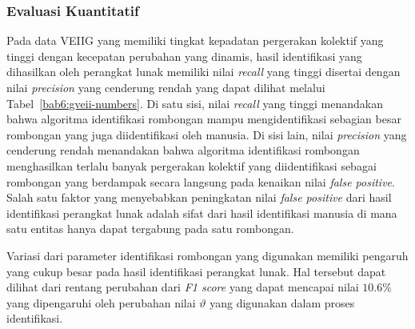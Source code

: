 \subsubsection{Evaluasi Kuantitatif}
\label{subsubsec:veiig-quantitative}

Pada data VEIIG yang memiliki tingkat kepadatan pergerakan kolektif yang tinggi dengan kecepatan perubahan yang dinamis, hasil identifikasi yang dihasilkan oleh perangkat lunak memiliki nilai \textit{recall} yang tinggi disertai dengan nilai \textit{precision} yang cenderung rendah yang dapat dilihat melalui Tabel~\ref{bab6:gveii-numbers}. Di satu sisi, nilai \textit{recall} yang tinggi menandakan bahwa algoritma identifikasi rombongan mampu mengidentifikasi sebagian besar rombongan yang juga diidentifikasi oleh manusia. Di sisi lain, nilai \textit{precision} yang cenderung rendah menandakan bahwa algoritma identifikasi rombongan menghasilkan terlalu banyak pergerakan kolektif yang diidentifikasi sebagai rombongan yang berdampak secara langsung pada kenaikan nilai \textit{false positive}. Salah satu faktor yang menyebabkan peningkatan nilai \textit{false positive} dari hasil identifikasi perangkat lunak adalah sifat dari hasil identifikasi manusia di mana satu entitas hanya dapat tergabung pada satu rombongan.

Variasi dari parameter identifikasi rombongan yang digunakan memiliki pengaruh yang cukup besar pada hasil identifikasi perangkat lunak. Hal tersebut dapat dilihat dari rentang perubahan dari \textit{F1 score} yang dapat mencapai nilai $10.6\%$ yang dipengaruhi oleh perubahan nilai $\vartheta$ yang digunakan dalam proses identifikasi.

